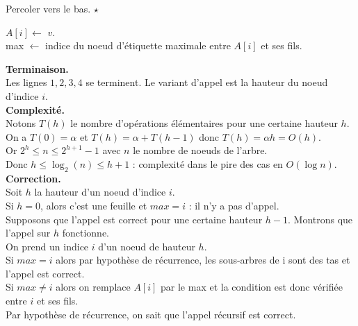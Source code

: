 \documentclass[french, 11pt]{article}
\begin{document}
\begin{defi}{Percoler vers le bas. $\star$}{}
    \begin{algorithm}[H]
        \LinesNumbered
        \caption{Percoler vers le bas}
        $A[i] \gets$ $v$.\\
        max $\gets$ indice du noeud d'étiquette maximale entre $A[i]$ et ses fils.\\
    \end{algorithm}\vspace{0.25cm}
    \textbf{Terminaison.}\\
    Les lignes $1,2,3,4$ se terminent. Le variant d'appel est la hauteur du noeud d'indice $i$.\\
    \textbf{Complexité.}\\
    Notons $T(h)$ le nombre d'opérations élémentaires pour une certaine hauteur $h$.\\
    On a $T(0) = \alpha$ et $T(h) = \alpha + T(h-1)$ donc $T(h) = \alpha h = O(h)$.\\
    Or $2^h \leq n \leq 2^{h+1}-1$ avec $n$ le nombre de noeuds de l'arbre.\\
    Donc $h \leq \log_2(n) \leq h+1$ : complexité dans le pire des cas en $O(\log n)$.\\
    \textbf{Correction.}\\
    Soit $h$ la hauteur d'un noeud d'indice $i$.\\
    Si $h=0$, alors c'est une feuille et $max = i$ : il n'y a pas d'appel.\\
    Supposons que l'appel est correct pour une certaine hauteur $h-1$. Montrons que l'appel sur $h$ fonctionne.\\
    On prend un indice $i$ d'un noeud de hauteur $h$.\\
    Si $max = i$ alors par hypothèse de récurrence, les sous-arbres de i sont des tas et l'appel est correct.\\
    Si $max \neq i$ alors on remplace $A[i]$ par le max et la condition est donc vérifiée entre $i$ et ses fils.\\
    Par hypothèse de récurrence, on sait que l'appel récursif est correct.
\end{defi}
\end{document}
